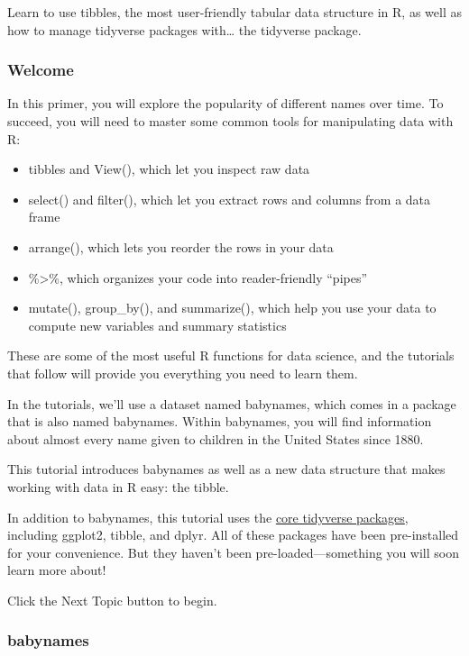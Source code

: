 \documentclass[
]{article}
\providecommand{\tightlist}{%
  \setlength{\itemsep}{0pt}\setlength{\parskip}{0pt}}
\begin{document}
Learn to use tibbles, the most user-friendly tabular data structure in
R, as well as how to manage tidyverse packages with\ldots{} the
tidyverse package.

\hypertarget{welcome-2}{%
\subsubsection{Welcome}\label{welcome-2}}

In this primer, you will explore the popularity of different names over
time. To succeed, you will need to master some common tools for
manipulating data with R:

\begin{itemize}
\tightlist
\item
  tibbles and View(), which let you inspect raw data
\item
  select() and filter(), which let you extract rows and columns from a
  data frame
\item
  arrange(), which lets you reorder the rows in your data
\item
  \%\textgreater\%, which organizes your code into reader-friendly
  ``pipes''
\item
  mutate(), group\_by(), and summarize(), which help you use your data
  to compute new variables and summary statistics
\end{itemize}

These are some of the most useful R functions for data science, and the
tutorials that follow will provide you everything you need to learn
them.

In the tutorials, we'll use a dataset named babynames, which comes in a
package that is also named babynames. Within babynames, you will find
information about almost every name given to children in the United
States since 1880.

This tutorial introduces babynames as well as a new data structure that
makes working with data in R easy: the tibble.

In addition to babynames, this tutorial uses the
\href{http://tidyverse.org/}{core tidyverse packages}, including
ggplot2, tibble, and dplyr. All of these packages have been
pre-installed for your convenience. But they haven't been
pre-loaded---something you will soon learn more about!

Click the Next Topic button to begin.

\hypertarget{babynames}{%
\subsubsection{babynames}\label{babynames}}
\end{document}
